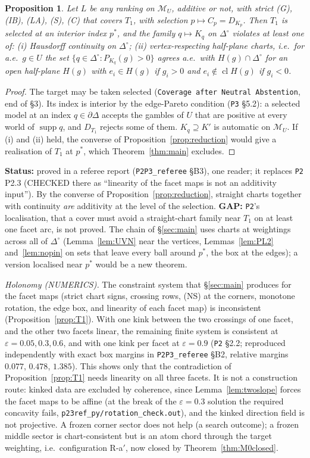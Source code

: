 \documentclass[11pt]{article}
\newtheorem{proposition}[theorem]{Proposition}
\theoremstyle{definition}
\theoremstyle{remark}
\newcommand{\Di}{\Delta^{\circ}}
\newcommand{\M}{\mathcal M}
\newcommand{\cl}{\operatorname{cl}}
\newcommand{\supp}{\operatorname{supp}}
\newcommand{\src}[1]{\texttt{#1}}
\newcommand{\status}[1]{\par\smallskip\noindent\textbf{Status:} #1\par\smallskip}
\begin{document}
\begin{proposition}\label{prop:P23}
Let $L$ be any ranking on $\M_U$, additive or not, with strict (G), (IB), (LA), (S), (C) that covers $T_1$, with selection $p\mapsto C_p=D_{K_p}$. Then $T_1$ is selected at an interior index $p^*$, and the family $q\mapsto K_q$ on $\Di$ violates at least one of: (i) Hausdorff continuity on $\Di$; (ii) vertex-respecting half-plane charts, i.e.\ for a.e.\ $g\in U$ the set $\{q\in\Di:P_{K_q}(g)>0\}$ agrees a.e.\ with $H(g)\cap\Di$ for an open half-plane $H(g)$ with $e_i\in H(g)$ if $g_i>0$ and $e_i\notin\cl H(g)$ if $g_i<0$.
\end{proposition}
\begin{proof}
The target may be taken selected (\src{Coverage after Neutral Abstention}, end of \S3). Its index is interior by the edge-Pareto condition (\src{P3} \S5.2): a selected model at an index $q\in\partial\Delta$ accepts the gambles of $U$ that are positive at every world of $\supp q$, and $D_{T_1}$ rejects some of them. $K_q\supseteq K'$ is automatic on $\M_U$. If (i) and (ii) held, the converse of Proposition~\ref{prop:reduction} would give a realisation of $T_1$ at $p^*$, which Theorem~\ref{thm:main} excludes.
\end{proof}
\status{proved in a referee report (\src{P2P3\_referee} \S B3), one reader; it replaces \src{P2} P2.3 (CHECKED there as ``linearity of the facet maps is not an additivity input''). By the converse of Proposition~\ref{prop:reduction}, straight charts together with continuity \emph{are} additivity at the level of the selection. \textbf{GAP:} \src{P2}'s localisation, that a cover must avoid a straight-chart family near $T_1$ on at least one facet arc, is not proved. The chain of \S\ref{sec:main} uses charts at weightings across all of $\Di$ (Lemma~\ref{lem:UVN} near the vertices, Lemmas~\ref{lem:PL2} and~\ref{lem:nopin} on sets that leave every ball around $p^*$, the box at the edges); a version localised near $p^*$ would be a new theorem.}

\emph{Holonomy (NUMERICS).} The constraint system that \S\ref{sec:main} produces for the facet maps (strict chart signs, crossing rows, (NS) at the corners, monotone rotation, the edge box, and linearity of each facet map) is inconsistent (Proposition~\ref{prop:T1}). With one kink between the two crossings of one facet, and the other two facets linear, the remaining finite system is consistent at $\varepsilon=0.05,0.3,0.6$, and with one kink per facet at $\varepsilon=0.9$ (\src{P2} \S2.2; reproduced independently with exact box margins in \src{P2P3\_referee} \S B2, relative margins $0.077$, $0.478$, $1.385$). This shows only that the contradiction of Proposition~\ref{prop:T1} needs linearity on all three facets. It is not a construction route: kinked data are excluded by coherence, since Lemma~\ref{lem:twoslope} forces the facet maps to be affine (at the break of the $\varepsilon=0.3$ solution the required concavity fails, \src{p23ref\_py/rotation\_check.out}), and the kinked direction field is not projective. A frozen corner sector does not help (a search outcome); a frozen middle sector is chart-consistent but is an atom chord through the target weighting, i.e.\ configuration R-a$'$, now closed by Theorem~\ref{thm:M0closed}.
\end{document}

